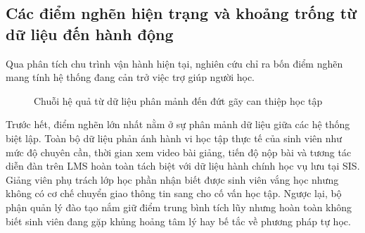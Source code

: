 \subsection{Các điểm nghẽn hiện trạng và khoảng trống từ dữ liệu đến hành động}
Qua phân tích chu trình vận hành hiện tại, nghiên cứu chỉ ra bốn điểm nghẽn mang tính hệ thống đang cản trở việc trợ giúp người học.

\begin{figure}[htbp]
\centering
{}
\caption{Chuỗi hệ quả từ dữ liệu phân mảnh đến đứt gãy can thiệp học tập}
\label{fig:bottlenecks}
\end{figure}

Trước hết, điểm nghẽn lớn nhất nằm ở sự phân mảnh dữ liệu giữa các hệ thống biệt lập. Toàn bộ dữ liệu phản ánh hành vi học tập thực tế của sinh viên như mức độ chuyên cần, thời gian xem video bài giảng, tiến độ nộp bài và tương tác diễn đàn trên LMS hoàn toàn tách biệt với dữ liệu hành chính học vụ lưu tại SIS. Giảng viên phụ trách lớp học phần nhận biết được sinh viên vắng học nhưng không có cơ chế chuyển giao thông tin sang cho cố vấn học tập. Ngược lại, bộ phận quản lý đào tạo nắm giữ điểm trung bình tích lũy nhưng hoàn toàn không biết sinh viên đang gặp khủng hoảng tâm lý hay bế tắc về phương pháp tự học.

